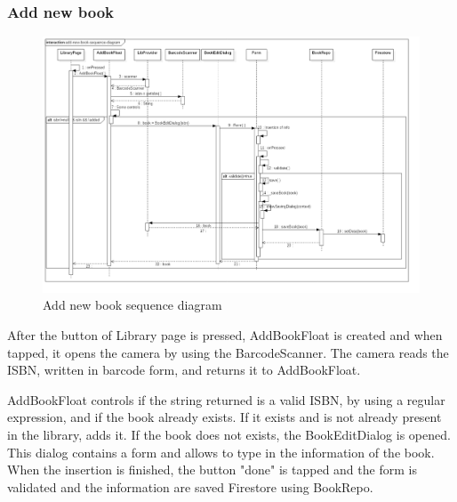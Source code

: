 \subsubsection{Add new book}
\begin{figure}[!h]
    \centering
    \includegraphics[scale=0.35]{images/add-new-book-sequence-diagram.png}
    \caption{Add new book sequence diagram}
    \label{ref:addnewbooksequencediagram}
\end{figure}
After the button of Library page is pressed, AddBookFloat is created and when tapped, it opens the camera by using the BarcodeScanner. 
The camera reads the ISBN, written in barcode form, and returns it to AddBookFloat.

AddBookFloat controls if the string returned is a valid ISBN, by using a regular expression, and if the book already exists. 
If it exists and is not already present in the library, adds it. If the book does not exists, the BookEditDialog is opened. 
This dialog contains a form and allows to type in the information of the book. 
When the insertion is finished, the button "done" is tapped and the form is validated and the information are saved 
Firestore using BookRepo. 